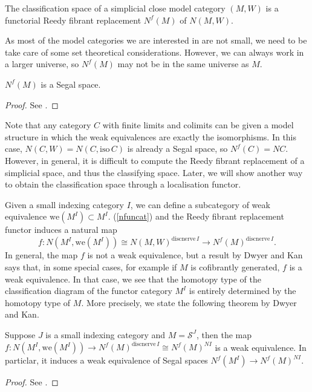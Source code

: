 \begin{defin}
The classification space of a simplicial close model category $(M,W)$ is a functorial Reedy fibrant replacement $N^f(M)$ of $N(M,W)$.
\end{defin}

As most of the model categories we are interested in are not small, we need to be take care of some set theoretical considerations. However, we can always work in a larger universe, so $N^f(M)$ may not be in the same universe as $M$.

\begin{thm}
$N^f(M)$ is a Segal space.
\end{thm}
\begin{proof}
See \cite[Thm 8.3]{rezk}.
\end{proof}

Note that any category $C$ with finite limits and colimits can be given a model structure in which the weak equivalences are exactly the isomorphisms. In this case, $N(C,W)=N(C,\mathrm{iso}\,C)$ is already a Segal space, so $N^f(C)=NC$. However, in general, it is difficult to compute the Reedy fibrant replacement of a simplicial space, and thus the classifying space. Later, we will show another way to obtain the classification space through a localisation functor.

Given a small indexing category $I$, we can define a subcategory of weak equivalence $\mathrm{we}(M^I)\subset M^I$. (\ref{nfuncat}) and the Reedy fibrant replacement functor induces a natural map
$$f:N(M^I,\mathrm{we}(M^I))\cong N(M,W)^{\mathrm{discnerve}\,I}\to N^f(M)^{\mathrm{discnerve}\,I}.$$
In general, the map $f$ is not a weak equivalence, but a result by Dwyer and Kan says that, in some special cases, for example if $M$ is cofibrantly generated, $f$ is a weak equivalence. In that case, we see that the homotopy type of the classification diagram of the functor category $M^I$ is entirely determined by the homotopy type of $M$. More precisely, we state the following theorem by Dwyer and Kan.
\begin{thm}
Suppose $J$ is a small indexing category and $M=\mathcal S^J$, then the map $f:N(M^I,\mathrm{we}(M^I))\to N^f(M)^{\mathrm{discnerve}\,I}\cong N^f(M)^{NI}$ is a weak equivalence. In particlar, it induces a weak equivalence of Segal spaces $N^f(M^I)\to N^f(M)^{NI}$.
\end{thm}
\begin{proof}
See \cite[Thm 8.11]{rezk}.
\end{proof}


